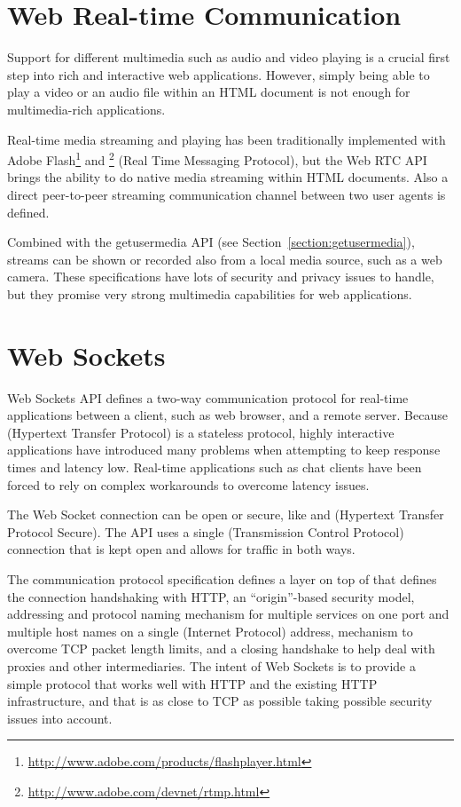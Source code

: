\section{Web Real-time Communication}

Support for different multimedia such as audio and video playing is a
crucial first step into rich and interactive web
applications. However, simply being able to play a video or an audio
file within an HTML document is not enough for multimedia-rich
applications.

Real-time media streaming and playing has been traditionally
implemented with Adobe
Flash\footnote{\url{http://www.adobe.com/products/flashplayer.html}}
and \footnote{\url{http://www.adobe.com/devnet/rtmp.html}}
(Real Time Messaging Protocol), but the Web RTC API \cite{WebRTC}
brings the ability to do native media streaming within HTML
documents. Also a direct peer-to-peer streaming communication channel
between two user agents is defined.

Combined with the getusermedia API \cite{getusermedia} (see
Section~\ref{section:getusermedia}), streams can be shown or recorded
also from a local media source, such as a web camera. These
specifications have lots of security and privacy issues to handle, but
they promise very strong multimedia capabilities for web applications.

\section{Web Sockets}

Web Sockets API \cite{WebSockets, WebSocketProtocol} defines a two-way
communication protocol for real-time applications between a client,
such as web browser, and a remote server. Because 
(Hypertext Transfer Protocol) is a stateless protocol, highly
interactive applications have introduced many problems when attempting
to keep response times and latency low. Real-time applications such as
chat clients have been forced to rely on complex workarounds to
overcome latency issues.

The Web Socket connection can be open or secure, like  and
 (Hypertext Transfer Protocol Secure). The API uses a
single  (Transmission Control Protocol) connection that is
kept open and allows for traffic in both ways. \cite{WebSockets,
  WebSocketProtocol}

The communication protocol specification defines a layer on top of
 that defines the connection handshaking with HTTP, an
``origin''-based security model, addressing and protocol naming
mechanism for multiple services on one port and multiple host names on
a single  (Internet Protocol) address, mechanism to overcome
TCP packet length limits, and a closing handshake to help deal with
proxies and other intermediaries. The intent of Web Sockets is to
provide a simple protocol that works well with HTTP and the existing
HTTP infrastructure, and that is as close to TCP as possible taking
possible security issues into account. \cite{WebSocketProtocol}

